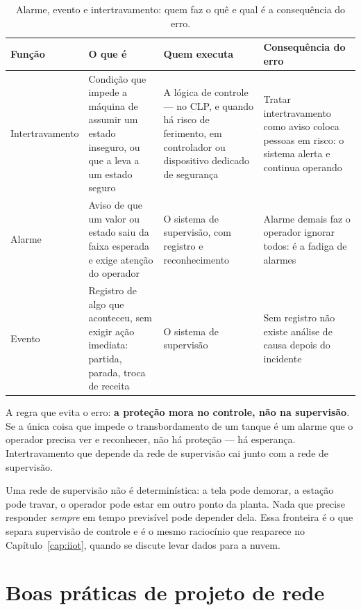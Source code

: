 \begin{table}[H]
  \centering
  \caption{Alarme, evento e intertravamento: quem faz o quê e qual é a consequência do erro.}
  \label{tab:alarme-evento}
  \begin{tabular}{p{2.8cm} p{4.3cm} p{3.0cm} p{4.1cm}}
    \toprule
    Função & O que é & Quem executa & Consequência do erro \\
    \midrule
    Intertravamento
      & Condição que impede a máquina de assumir um estado inseguro, ou que a leva a um estado
        seguro
      & A lógica de controle --- no CLP, e quando há risco de ferimento, em controlador ou
        dispositivo dedicado de segurança
      & Tratar intertravamento como aviso coloca pessoas em risco: o sistema alerta e continua
        operando \\
    \addlinespace
    Alarme
      & Aviso de que um valor ou estado saiu da faixa esperada e exige atenção do operador
      & O sistema de supervisão, com registro e reconhecimento
      & Alarme demais faz o operador ignorar todos: é a fadiga de alarmes \\
    \addlinespace
    Evento
      & Registro de algo que aconteceu, sem exigir ação imediata: partida, parada, troca de receita
      & O sistema de supervisão
      & Sem registro não existe análise de causa depois do incidente \\
    \bottomrule
  \end{tabular}
\end{table}

A regra que evita o erro: \textbf{a proteção mora no controle, não na supervisão}. Se a única coisa
que impede o transbordamento de um tanque é um alarme que o operador precisa ver e reconhecer, não há
proteção --- há esperança. Intertravamento que depende da rede de supervisão cai junto com a rede de
supervisão.

\begin{atencao}
Uma rede de supervisão não é determinística: a tela pode demorar, a estação pode travar, o operador
pode estar em outro ponto da planta. Nada que precise responder \emph{sempre} em tempo previsível
pode depender dela. Essa fronteira é o que separa supervisão de controle e é o mesmo raciocínio que
reaparece no Capítulo~\ref{cap:iiot}, quando se discute levar dados para a nuvem.
\end{atencao}

\section{Boas práticas de projeto de rede}

